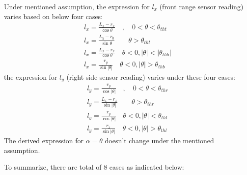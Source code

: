 \documentclass[12pt, letterpaper]{amsart} %
\numberwithin{equation}{section}
\begin{document}
Under mentioned assumption, the expression for $l_x$ (front range sensor reading) varies based on below four cases:
\begin{align*}
  l_x = \frac{L_x - r_x}{\cos \theta} \quad ,\quad 0 < \theta < \theta_{tht} \\
  l_x = \frac{L_y - r_y}{\sin \theta} \qquad  \theta > \theta_{tht} \\
  l_x = \frac{L_x - r_x}{\cos \theta} \quad \theta < 0, |\theta| < |\theta_{thb}| \\
  l_x = \frac{r_y}{\sin|\theta|} \quad \theta < 0, |\theta| > \theta_{thb}
\end{align*}
the expression for $l_y$ (right side sensor reading) varies under these four cases:
\begin{align*}
  l_y = \frac{r_y}{\cos |\theta|} \quad  ,\quad 0 < \theta < \theta_{thr} \\
  l_y = \frac{L_x - r_x}{\sin |\theta|} \qquad \theta > \theta_{thr} \\
  l_y = \frac{r_y}{\cos |\theta|} \quad \theta < 0, |\theta| < \theta_{thl} \\
  l_y = \frac{r_x}{\sin |\theta|} \quad \theta < 0, |\theta| > \theta_{thl}
\end{align*}
The derived expression for $\alpha = \theta$ doesn't change under the mentioned assumption. \par
\newpage
To summarize, there are total of 8 cases as indicated below:
\\
\end{document}
